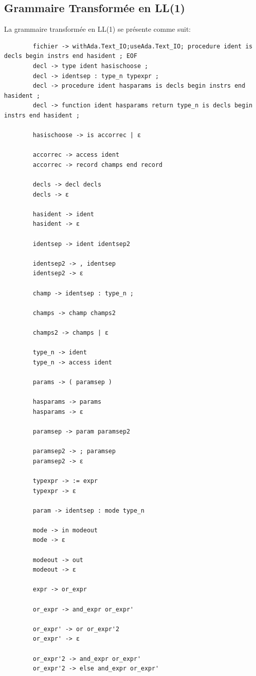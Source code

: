 \documentclass[french,a4paper]{article}
\begin{document}
    \subsection{Grammaire Transformée en LL(1)}\label{subsec:grammaire-transformee-en-ll(1)}
    La grammaire transformée en LL(1) se présente comme suit:
    \begin{verbatim}
        fichier -> withAda.Text_IO;useAda.Text_IO; procedure ident is decls begin instrs end hasident ; EOF
        decl -> type ident hasischoose ;
        decl -> identsep : type_n typexpr ;
        decl -> procedure ident hasparams is decls begin instrs end hasident ;
        decl -> function ident hasparams return type_n is decls begin instrs end hasident ;

        hasischoose -> is accorrec | ε

        accorrec -> access ident
        accorrec -> record champs end record

        decls -> decl decls
        decls -> ε

        hasident -> ident
        hasident -> ε

        identsep -> ident identsep2

        identsep2 -> , identsep
        identsep2 -> ε

        champ -> identsep : type_n ;

        champs -> champ champs2

        champs2 -> champs | ε

        type_n -> ident
        type_n -> access ident

        params -> ( paramsep )

        hasparams -> params
        hasparams -> ε

        paramsep -> param paramsep2

        paramsep2 -> ; paramsep
        paramsep2 -> ε

        typexpr -> := expr
        typexpr -> ε

        param -> identsep : mode type_n

        mode -> in modeout
        mode -> ε

        modeout -> out
        modeout -> ε

        expr -> or_expr

        or_expr -> and_expr or_expr'

        or_expr' -> or or_expr'2
        or_expr' -> ε

        or_expr'2 -> and_expr or_expr'
        or_expr'2 -> else and_expr or_expr'


\end{verbatim}
\end{document}

